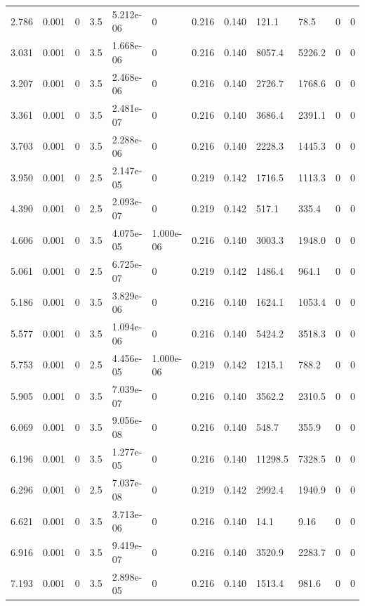 \documentclass[preview]{standalone}
\begin{document}
{{\begin{tabular}{L{1.2cm}C{1.2cm} C{0.3cm}C{0.5cm} C{1.4cm}C{1.4cm} C{1.4cm}C{1.4cm} C{1.6cm}C{1.6cm} C{1.6cm}C{1.6cm}}
  2.786  &  0.001  & 0     & 3.5 &  5.212e-06  & 0  &  0.216&   0.140& 121.1 & 78.5   &  0 & 0  \\ 
  3.031  &  0.001  & 0     & 3.5 &  1.668e-06  & 0  &  0.216&   0.140& 8057.4 & 5226.2   &  0 & 0  \\ 
  3.207  &  0.001  & 0     & 3.5 &  2.468e-06  & 0  &  0.216&   0.140& 2726.7 & 1768.6   &  0 & 0  \\ 
  3.361  &  0.001  & 0     & 3.5 &  2.481e-07  & 0  &  0.216&   0.140& 3686.4 & 2391.1   &  0 & 0  \\ 
  3.703  &  0.001  & 0     & 3.5 &  2.288e-06  & 0  &  0.216&   0.140& 2228.3 & 1445.3   &  0 & 0  \\ 
  3.950  &  0.001  & 0     & 2.5 &  2.147e-05  & 0  &  0.219&   0.142& 1716.5 & 1113.3   &  0 & 0  \\ 
  4.390  &  0.001  & 0     & 2.5 &  2.093e-07  & 0  &  0.219&   0.142& 517.1 & 335.4   &  0 & 0  \\ 
  4.606  &  0.001  & 0     & 3.5 &  4.075e-05  & 1.000e-06  &  0.216&   0.140& 3003.3 & 1948.0   &  0 & 0  \\ 
  5.061  &  0.001  & 0     & 2.5 &  6.725e-07  & 0  &  0.219&   0.142& 1486.4 & 964.1   &  0 & 0  \\ 
  5.186  &  0.001  & 0     & 3.5 &  3.829e-06  & 0  &  0.216&   0.140& 1624.1 & 1053.4   &  0 & 0  \\ 
  5.577  &  0.001  & 0     & 3.5 &  1.094e-06  & 0  &  0.216&   0.140& 5424.2 & 3518.3   &  0 & 0  \\ 
  5.753  &  0.001  & 0     & 2.5 &  4.456e-05  & 1.000e-06  &  0.219&   0.142& 1215.1 & 788.2   &  0 & 0  \\ 
  5.905  &  0.001  & 0     & 3.5 &  7.039e-07  & 0  &  0.216&   0.140& 3562.2 & 2310.5   &  0 & 0  \\ 
  6.069  &  0.001  & 0     & 3.5 &  9.056e-08  & 0  &  0.216&   0.140& 548.7 & 355.9   &  0 & 0  \\ 
  6.196  &  0.001  & 0     & 3.5 &  1.277e-05  & 0  &  0.216&   0.140& 11298.5 & 7328.5   &  0 & 0  \\ 
  6.296  &  0.001  & 0     & 2.5 &  7.037e-08  & 0  &  0.219&   0.142& 2992.4 & 1940.9   &  0 & 0  \\ 
  6.621  &  0.001  & 0     & 3.5 &  3.713e-06  & 0  &  0.216&   0.140& 14.1 & 9.16   &  0 & 0  \\ 
  6.916  &  0.001  & 0     & 3.5 &  9.419e-07  & 0  &  0.216&   0.140& 3520.9 & 2283.7   &  0 & 0  \\ 
  7.193  &  0.001  & 0     & 3.5 &  2.898e-05  & 0  &  0.216&   0.140& 1513.4 & 981.6   &  0 & 0  \\ 

\end{tabular}}}
\end{document}
